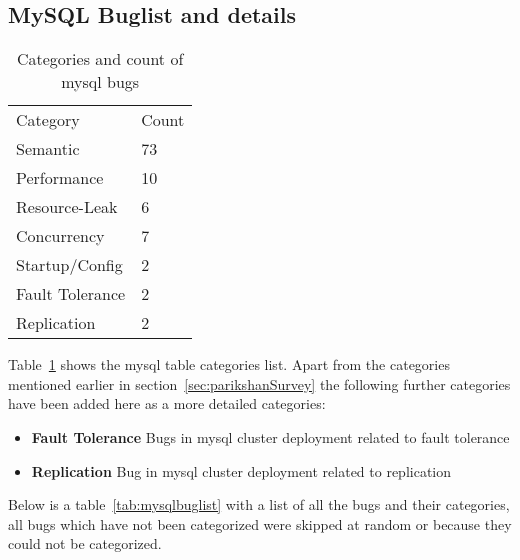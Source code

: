 \subsection{MySQL Buglist and details}
\label{sec:mysqlbugs}


\begin{table}[]
\centering
\caption{Categories and count of mysql bugs}
\label{tab:mysqlbugcategories}
\begin{tabular}{ll}
Category        & Count \\
Semantic        & 73    \\
Performance     & 10    \\
Resource-Leak   & 6     \\
Concurrency     & 7     \\
Startup/Config  & 2     \\
Fault Tolerance & 2     \\
Replication     & 2    
\end{tabular}
\end{table}

Table~\ref{tab:mysqlbugcategories} shows the mysql table categories list. Apart from the categories mentioned earlier in section~\ref{sec:parikshanSurvey} the following further categories have been added here as a more detailed categories:

\begin{itemize}
		
	\item \textbf{Fault Tolerance} Bugs in mysql cluster deployment related to fault tolerance
	\item \textbf{Replication} Bug in mysql cluster deployment related to replication
	
\end{itemize}

Below is a table~\ref{tab:mysqlbuglist} with a list of all the bugs and their categories, all bugs which have not been categorized were skipped at random or because they could not be categorized. 


